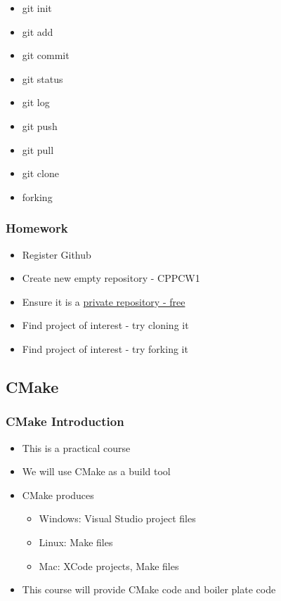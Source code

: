 \begin{itemize}
\itemsep1pt\parskip0pt
\item
  git init
\item
  git add
\item
  git commit
\item
  git status
\item
  git log
\item
  git push
\item
  git pull
\item
  git clone
\item
  forking
\end{itemize}

\subsubsection{Homework}\label{homework}

\begin{itemize}
\itemsep1pt\parskip0pt
\item
  Register Github
\item
  Create new empty repository - CPPCW1
\item
  Ensure it is a
  \href{https://www.ucl.ac.uk/isd/services/research-it/research-software/github/github-signup/}{private
  repository - free}
\item
  Find project of interest - try cloning it
\item
  Find project of interest - try forking it
\end{itemize}

\subsection{CMake}\label{cmake}

\subsubsection{CMake Introduction}\label{cmake-introduction}

\begin{itemize}
\itemsep1pt\parskip0pt
\item
  This is a practical course
\item
  We will use CMake as a build tool
\item
  CMake produces

  \begin{itemize}
  \itemsep1pt\parskip0pt
  \item
    Windows: Visual Studio project files
  \item
    Linux: Make files
  \item
    Mac: XCode projects, Make files
  \end{itemize}
\item
  This course will provide CMake code and boiler plate code
\end{itemize}

